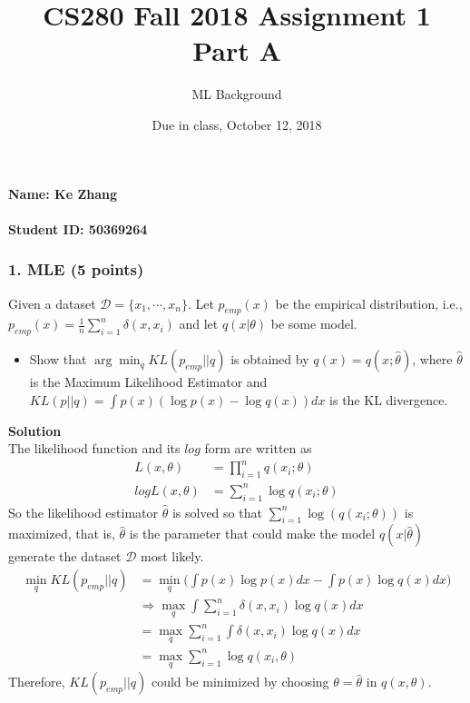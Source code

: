 \documentclass[12pt]{article}%
\begin{document}
\title{CS280 Fall 2018 Assignment 1 \\ Part A}
\author{ML Background}
\date{Due in class, October 12, 2018}
\maketitle

\paragraph{Name: Ke Zhang}

\paragraph{Student ID: 50369264 }

\newpage


\subsubsection*{1. MLE (5 points)}
Given a dataset $\mathcal{D} = \{x_1,\cdots, x_n\}$. Let $p_{emp}(x)$ be the empirical distribution, i.e., $p_{emp}(x)=\frac{1}{n}\sum_{i=1}^n\delta(x,x_i) $ and let $q(x|\theta)$ be some model.  
\begin{itemize}
	\item Show that $\arg\min_q KL(p_{emp}||q)$ is obtained by $q(x)=q(x;\hat{\theta})$, where $\hat{\theta}$ is the Maximum Likelihood Estimator and $KL(p||q)=\int p(x)(\log p(x)- \log q(x))dx$ is the KL divergence.
\end{itemize}
\textbf{Solution}\\
The likelihood function and its $ log $ form are written as
\begin{align*}
L(x,\theta)&=\prod_{i=1}^{n}q(x_i;\theta)\\
logL(x,\theta)&=\sum_{i=1}^{n}\log q(x_i;\theta)
\end{align*}
So the likelihood estimator $ \hat{\theta} $ is solved so that $ \sum_{i=1}^{n}\log(q(x_i;\theta)) $ is maximized, that is, $ \hat{\theta} $ is the parameter that could make the model $ q(x|\hat{\theta}) $ generate the dataset $ \mathcal{D} $ most likely.\\
\begin{align*}
\min_q KL(p_{emp}||q)&=\min_q \Big(\int p(x)\log p(x)dx- \int p(x)\log q(x)dx\Big)\\
&\Rightarrow\max_q\int \sum_{i=1}^n\delta(x,x_i)\log q(x)dx\\
&=\max_q\sum_{i=1}^n\int\delta(x,x_i)\log q(x)dx\\
&=\max_q\sum_{i=1}^{n}\log q(x_i,\theta)
\end{align*}
Therefore, $ KL(p_{emp}||q) $ could be minimized by choosing $ \theta=\hat{\theta} $ in $ q(x,\theta) $.
\end{document}
